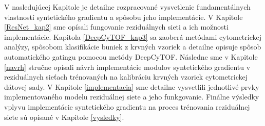 V nasledujúcej Kapitole je detailne rozpracované vysvetlenie fundamentálnych vlastností syntetického gradientu a spôsobu jeho implementácie. V Kapitole \ref{ResNet_kap2} sme opísali fungovanie reziduálnych sieti a ich možnosti implementácie. Kapitola \ref{DeepCyTOF_kap3} sa zaoberá metódami cytometrickej analýzy, spôsobom klasifikácie buniek z krvných vzoriek a detailne opisuje spôsob automatického gatingu pomocou metódy DeepCyTOF. Následne sme v Kapitole \ref{navrh} stručne opísali návrh implementácie modulov syntetického gradientu v reziduálnych sieťach trénovaných na kalibráciu krvných vzoriek cytometrickej dátovej sady. V Kapitole \ref{implementacia} sme detailne vysvetlili jednotlivé prvky implementovaného modelu reziduálnej siete a jeho funkgovanie. Finálne výsledky vplyvu implementácie syntetického gradientu na proces trénovania reziduálnej siete sú opísané v Kapitole \ref{vysledky}.
